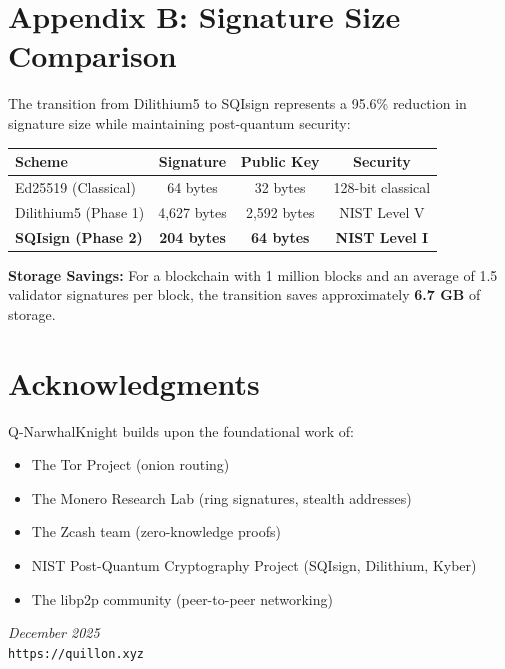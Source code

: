 \documentclass[12pt,a4paper]{article}
\begin{document}
\section*{Appendix B: Signature Size Comparison}

The transition from Dilithium5 to SQIsign represents a 95.6\% reduction in signature size while maintaining post-quantum security:

\begin{center}
\begin{tabular}{|l|c|c|c|}
\hline
\textbf{Scheme} & \textbf{Signature} & \textbf{Public Key} & \textbf{Security} \\
\hline
Ed25519 (Classical) & 64 bytes & 32 bytes & 128-bit classical \\
Dilithium5 (Phase 1) & 4,627 bytes & 2,592 bytes & NIST Level V \\
\textbf{SQIsign (Phase 2)} & \textbf{204 bytes} & \textbf{64 bytes} & \textbf{NIST Level I} \\
\hline
\end{tabular}
\end{center}

\textbf{Storage Savings:} For a blockchain with 1 million blocks and an average of 1.5 validator signatures per block, the transition saves approximately \textbf{6.7 GB} of storage.

\section*{Acknowledgments}

Q-NarwhalKnight builds upon the foundational work of:
\begin{itemize}
    \item The Tor Project (onion routing)
    \item The Monero Research Lab (ring signatures, stealth addresses)
    \item The Zcash team (zero-knowledge proofs)
    \item NIST Post-Quantum Cryptography Project (SQIsign, Dilithium, Kyber)
    \item The libp2p community (peer-to-peer networking)
\end{itemize}

\vfill
\begin{center}
\textit{December 2025}\\[0.5cm]
\texttt{https://quillon.xyz}
\end{center}
\end{document}
